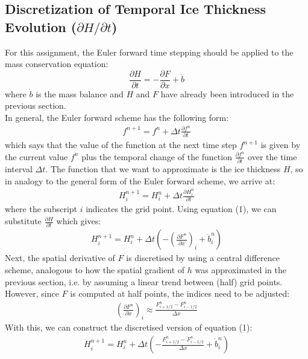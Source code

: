 \documentclass{article}
\begin{document}
\subsection*{Discretization of Temporal Ice Thickness Evolution (\( \partial H / \partial t \))}
For this assignment, the Euler forward time stepping should be applied to the mass conservation equation:
\begin{equation*}
    \frac{\partial H}{\partial t} = -\frac{\partial F}{\partial x} + \dot{b}
\end{equation*}
where \( \dot{b} \) is the mass balance and $H$ and $F$ have already been introduced in the previous section.\\
In general, the Euler forward scheme has the following form:
\begin{align*}
    f^{n+1} = f^{n} + \Delta t \frac{\partial f^n}{\partial t}
\end{align*}
which says that the value of the function at the next time step $f^{n+1}$ is given by the current value $f^{n}$ plus the temporal change of the function $\frac{\partial f^n}{\partial t}$ over the time interval $\Delta t$.
The function that we want to approximate is the ice thickness $H$, so in analogy to the general form of the Euler forward scheme, we arrive at:
\begin{align*}
    H_{i}^{n+1} = H_{i}^{n} + \Delta t \frac{\partial H_{i}^{n}}{\partial t}
\end{align*}
where the subscript $i$ indicates the grid point.
Using equation (1), we can substitute $\frac{\partial H}{\partial t}$ which gives:
\begin{align*}
    H_{i}^{n+1} = H_{i}^{n} + \Delta t \left( - \left(\frac{\partial F^{n}}{\partial x} \right)_{i} + \dot{b}^{n}_{i} \right)
\end{align*}
Next, the spatial derivative of $F$ is discretised by using a central difference scheme, analogous to how the spatial gradient of $h$ was approximated in the previous section, i.e. by assuming a linear trend between (half) grid points. 
However, since $F$ is computed at half points, the indices need to be adjusted:
\begin{align*}
    \left( \frac{\partial F^{n}}{\partial x} \right)_{i} \approx \frac{F^{n}_{i+1/2} - F^{n}_{i-1/2}}{\Delta x}
\end{align*}
With this, we can construct the discretised version of equation (1):
\begin{align*}
    \boxed{H_{i}^{n+1} = H_{i}^{n} + \Delta t \left( -\frac{F^{n}_{i+1/2} - F^{n}_{i-1/2}}{\Delta x} +  \dot{b}^{n}_{i} \right)}
\end{align*}
\end{document}
